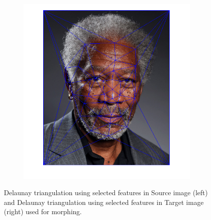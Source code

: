 \documentclass{paper}
\begin{document}
\begin{figure}[H]
\begin{subfigure}{0.45\textwidth}
        \includegraphics[width=\textwidth]{morph/triangulation_target}
    \end{subfigure}
    
    \caption{Delaunay triangulation using selected features in Source image (left) and Delaunay triangulation using selected features in Target image  (right) used for morphing.}
    \label{fig:morphing_delaunay}       
\end{figure}
\end{document}
